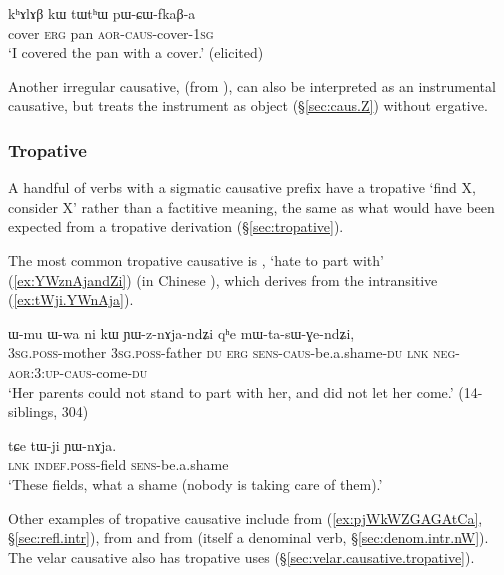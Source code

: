 \begin{exe}
\ex \label{ex:pWCWfkaB}
\gll kʰɤlɤβ kɯ tɯtʰɯ pɯ-ɕɯ-fkaβ-a \\
cover \textsc{erg} pan \textsc{aor}-\textsc{caus}-cover-\textsc{1sg} \\
\glt `I covered the pan with a cover.' (elicited)
\end{exe}

Another irregular causative,   (from ), can also be interpreted as an instrumental causative, but treats the instrument as object (§\ref{sec:caus.Z}) without ergative.

\subsubsection{Tropative} \label{sec:sig.caus.tropative}
A handful of verbs with a sigmatic causative prefix have a tropative `find X, consider X' rather than a factitive meaning,  the same as what would have been expected from a   tropative derivation  (§\ref{sec:tropative}).

The most common tropative causative is  , `hate to part with' (\ref{ex:YWznAjandZi}) (in Chinese ), which derives from the intransitive  (\ref{ex:tWji.YWnAja}). 

\begin{exe}
\ex \label{ex:YWznAjandZi}
\gll ɯ-mu ɯ-wa ni kɯ ɲɯ-z-nɤja-ndʑi qʰe mɯ-ta-sɯ-ɣe-ndʑi, \\
\textsc{3sg}.\textsc{poss}-mother \textsc{3sg}.\textsc{poss}-father \textsc{du} \textsc{erg} \textsc{sens}-\textsc{caus}-be.a.shame-\textsc{du} \textsc{lnk} \textsc{neg}-\textsc{aor}:3\flobv{}:\textsc{up}-\textsc{caus}-come-\textsc{du} \\
\glt `Her parents could not stand to part with her, and did not let her come.' (14-siblings, 304)
\end{exe}
 
\begin{exe}
\ex \label{ex:tWji.YWnAja}
\gll  tɕe tɯ-ji ɲɯ-nɤja.   \\
\textsc{lnk} \textsc{indef}.\textsc{poss}-field \textsc{sens}-be.a.shame \\
\glt `These fields, what a shame (nobody is taking care of them).' 
 \end{exe}
 

Other examples of tropative causative include  from  (\ref{ex:pjWkWZGAGAtCa}, §\ref{sec:refl.intr}),   from  and   from  (itself a denominal verb, §\ref{sec:denom.intr.nW}). The velar causative also has tropative uses (§\ref{sec:velar.causative.tropative}).

